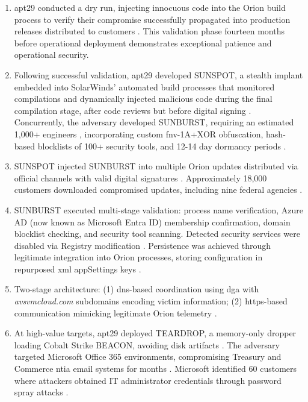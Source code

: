 \begin{enumerate}
    \item {} \gls{apt}29 conducted a dry run, injecting innocuous code into the Orion build process to verify their compromise successfully propagated into production releases distributed to customers \cite{openhearing2021}. This validation phase fourteen months before operational deployment demonstrates exceptional patience and operational security.
    \item {} Following successful validation, \gls{apt}29 developed SUNSPOT, a stealth implant embedded into SolarWinds' automated build processes that monitored compilations and dynamically injected malicious code during the final compilation stage, after code reviews but before digital signing \cite{crowdstrike2021, openhearing2021}. Concurrently, the adversary developed SUNBURST, requiring an estimated 1,000+ engineers \cite{microsoft2020, nagle2023}, incorporating custom \gls{fnv}-1A+XOR obfuscation, hash-based blocklists of 100+ security tools, and 12-14 day dormancy periods \cite{eckels2020}.
    \item {} SUNSPOT injected SUNBURST into multiple Orion updates distributed via official channels with valid digital signatures \cite{fireeye2020}. Approximately 18,000 customers downloaded compromised updates, including nine federal agencies \cite{openhearing2021}.
    \item {} SUNBURST executed multi-stage validation: process name verification, Azure AD (now known as Microsoft Entra ID) membership confirmation, domain blocklist checking, and security tool scanning. Detected security services were disabled via Registry modification \cite{eckels2020}. Persistence was achieved through legitimate integration into Orion processes, storing configuration in repurposed \gls{xml} appSettings keys \cite{fireeye2020}.
    \item {} Two-stage architecture: (1) \gls{dns}-based coordination using \gls{dga} with \textit{avsvmcloud.com} subdomains encoding victim information; (2) \gls{https}-based communication mimicking legitimate Orion telemetry \cite{eckels2020, fireeye2020}.
    \item {} At high-value targets, \gls{apt}29 deployed TEARDROP, a memory-only dropper loading Cobalt Strike BEACON, avoiding disk artifacts \cite{fireeye2020}. The adversary targeted Microsoft Office 365 environments, compromising Treasury and Commerce \gls{ntia} email systems for months \cite{nagle2023}. Microsoft identified 60 customers where attackers obtained IT administrator credentials through password spray attacks \cite{openhearing2021}.
\end{enumerate}

